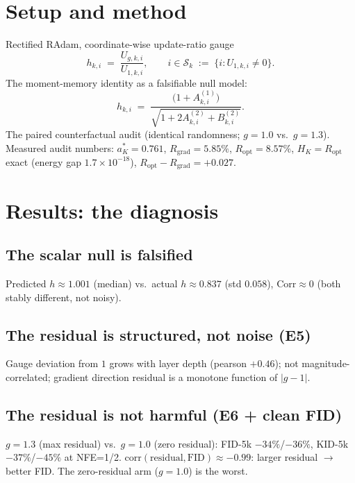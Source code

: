 \documentclass[11pt,a4paper]{article}
\begin{document}
\section{Setup and method}
\label{sec:method}

Rectified RAdam, coordinate-wise update-ratio gauge
\begin{equation}
  h_{k,i} \;=\; \frac{U_{g,k,i}}{U_{1,k,i}}, \qquad
  i \in \mathcal{S}_k \;:=\; \bigl\{ i : U_{1,k,i}\neq 0 \bigr\}.
  \label{eq:gauge}
\end{equation}
The moment-memory identity as a falsifiable null model:
\begin{equation}
  h_{k,i} \;=\;
  \frac{\bigl(1 + A^{(1)}_{k,i}\bigr)}
       {\sqrt{1 + 2 A^{(2)}_{k,i} + B^{(2)}_{k,i}}}.
  \label{eq:exact}
\end{equation}
The paired counterfactual audit (identical randomness; $g=1.0$ vs.\ $g=1.3$).
Measured audit numbers: $a_K^*=0.761$, $R_{\mathrm{grad}}=5.85\%$,
$R_{\mathrm{opt}}=8.57\%$, $H_K=R_{\mathrm{opt}}$ exact (energy gap $1.7\times
10^{-18}$), $R_{\mathrm{opt}}-R_{\mathrm{grad}}=+0.027$.

\section{Results: the diagnosis}
\label{sec:results}

\subsection{The scalar null is falsified}
Predicted $h\approx 1.001$ (median) vs.\ actual $h\approx 0.837$ (std $0.058$),
$\mathrm{Corr}\approx 0$ (both stably different, not noisy).

\subsection{The residual is structured, not noise (E5)}
Gauge deviation from $1$ grows with layer depth (pearson $+0.46$); not
magnitude-correlated; gradient direction residual is a monotone function of
$|g-1|$.

\subsection{The residual is not harmful (E6 + clean FID)}
$g=1.3$ (max residual) vs.\ $g=1.0$ (zero residual): FID-5k $-34\%$/$-36\%$,
KID-5k $-37\%$/$-45\%$ at NFE=1/2. $\mathrm{corr}(\text{residual},\text{FID})
\approx -0.99$: larger residual $\to$ better FID. The zero-residual arm
($g=1.0$) is the worst.
\end{document}
